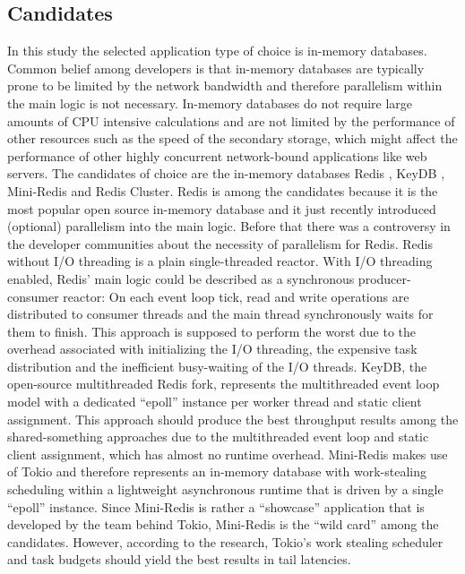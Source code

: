 \subsection{Candidates}
In this study the selected application type of choice is in-memory databases. Common belief among developers is that in-memory databases are typically prone to be limited by the network bandwidth and therefore parallelism within the main logic is not necessary. In-memory databases do not require large amounts of CPU intensive calculations and are not limited by the performance of other resources such as the speed of the secondary storage, which might affect the performance of other highly concurrent network-bound applications like web servers. \newline
The candidates of choice are the in-memory databases Redis \cite{soft:redis}, KeyDB \cite{soft:keydb}, Mini-Redis \cite{soft:miniredis} and Redis Cluster.  \newline
Redis is among the candidates because it is the most popular open source in-memory database and it just recently introduced (optional) parallelism into the main logic. Before that there was a controversy in the developer communities about the necessity of parallelism for Redis. Redis without I/O threading is a plain single-threaded reactor. With I/O threading enabled, Redis’ main logic could be described as a synchronous producer-consumer reactor: On each event loop tick, read and write operations are distributed to consumer threads and the main thread synchronously waits for them to finish. This approach is supposed to perform the worst due to the overhead associated with initializing the I/O threading, the expensive task distribution and the inefficient busy-waiting of the I/O threads. \newline
KeyDB, the open-source multithreaded Redis fork, represents the multithreaded event loop model with a dedicated “epoll” instance per worker thread and static client assignment. This approach should produce the best throughput results among the shared-something approaches due to the multithreaded event loop and static client assignment, which has almost no runtime overhead. \newline
Mini-Redis makes use of Tokio and therefore represents an in-memory database with work-stealing scheduling within a lightweight asynchronous runtime that is driven by a single “epoll” instance. Since Mini-Redis is rather a “showcase” application that is developed by the team behind Tokio, Mini-Redis is the “wild card” among the candidates. However, according to the research, Tokio’s work stealing scheduler and task budgets should yield the best results in tail latencies. \newline
